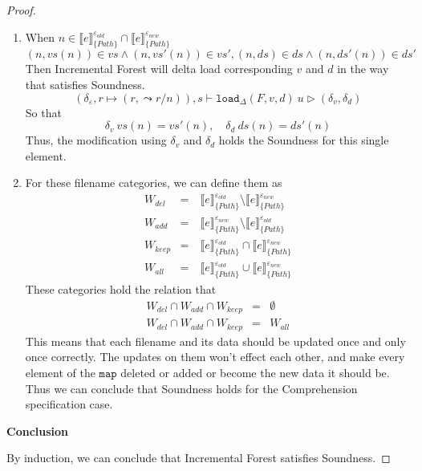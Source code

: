 \documentclass[10pt,twoside,a4paper]{article}
\theoremstyle{theorem}
\theoremstyle{lemma}
\theoremstyle{property}
\theoremstyle{definition}
\theoremstyle{assumption}
\begin{document}
\begin{proof}
\begin{enumerate}
	\item
	When $ n \in \llbracket e \rrbracket^{\varepsilon_{old}}_{\{Path\}} \cap \llbracket e \rrbracket^{\varepsilon_{new}}_{\{Path\}}$
	\begin{displaymath}
		(n, vs(n)) \in vs \wedge (n, vs'(n)) \in vs', (n, ds) \in ds \wedge (n, ds'(n)) \in ds'
	\end{displaymath}
	Then Incremental Forest will delta load corresponding $v$ and $d$ in the way that satisfies Soundness.
	\begin{displaymath}
		(\delta_\varepsilon, r \mapsto (r, \leadsto r/n)), s \vdash \mathtt{load}_\Delta (F,v,d)~ u \rhd (\delta_v,\delta_d)
	\end{displaymath}
	So that
	\begin{displaymath}
		\delta_v ~vs(n) = vs'(n), \quad \delta_d ~ds(n) = ds'(n)
	\end{displaymath}
	Thus, the modification using $\delta_v$ and $\delta_d$ holds the Soundness for this single element.

	\item
	For these filename categories, we can define them as
	\begin{eqnarray*}
		W_{del} &=& ~\llbracket e \rrbracket^{\varepsilon_{old}}_{\{Path\}} \setminus \llbracket e \rrbracket^{\varepsilon_{new}}_{\{Path\}}\\
		W_{add} &=& ~\llbracket e \rrbracket^{\varepsilon_{new}}_{\{Path\}} \setminus \llbracket e \rrbracket^{\varepsilon_{old}}_{\{Path\}}\\
		W_{keep} &=& ~\llbracket e \rrbracket^{\varepsilon_{old}}_{\{Path\}} \cap \llbracket e \rrbracket^{\varepsilon_{new}}_{\{Path\}}\\
		W_{all} &=& ~\llbracket e \rrbracket^{\varepsilon_{old}}_{\{Path\}} \cup \llbracket e \rrbracket^{\varepsilon_{new}}_{\{Path\}}
	\end{eqnarray*}
	These categories hold the relation that
	\begin{eqnarray*}
		W_{del} \cap W_{add} \cap W_{keep} &=& \emptyset\\
		W_{del} \cap W_{add} \cap W_{keep} &=& W_{all}
	\end{eqnarray*}
	This means that each filename and its data should be updated once and only once correctly. The updates on them won't effect each other, and make every element of the $\mathtt{map}$ deleted or added or become the new data it should be. Thus we can conclude that Soundness holds for the Comprehension specification case.
	\end{enumerate} 

	\textbf{Conclusion}

	By induction, we can conclude that Incremental Forest satisfies Soundness.
\end{proof}
\end{document}
